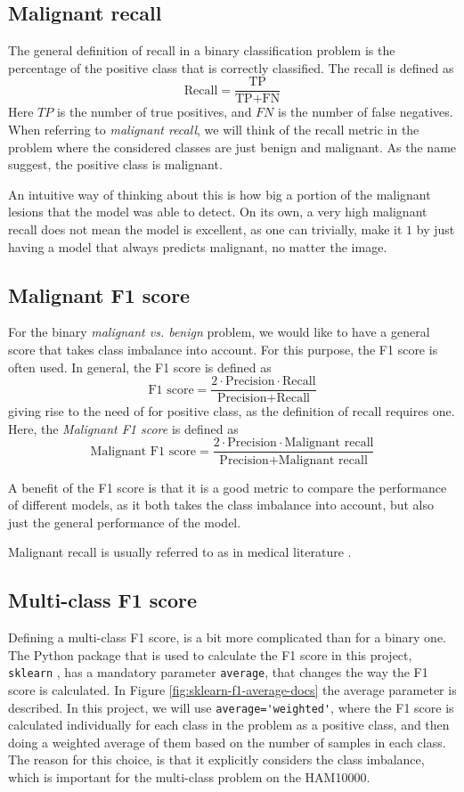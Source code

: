 \subsection{Malignant recall}
The general definition of recall in a binary classification problem is the percentage of the positive class
that is correctly classified.
The recall is defined as
\[
    \text{Recall} = \frac{\text{TP}}{\text{TP} + \text{FN}}
\]
Here $TP$ is the number of true positives, and $FN$ is the number of false negatives.
When referring to \textit{malignant recall}, we will think of the recall metric in the problem
where the considered classes are just benign and malignant.
As the name suggest, the positive class is malignant.

An intuitive way of thinking about this is how big a portion of the malignant lesions
that the model was able to detect.
On its own, a very high malignant recall does not mean the model is excellent,
as one can trivially, make it $1$ by just having a model that always predicts malignant, no matter the image.

\subsection{Malignant F1 score}
For the binary \textit{malignant vs. benign} problem, we would like to have a general score 
that takes class imbalance into account.
For this purpose, the F1 score is often used.
In general, the F1 score is defined as
\[
    \text{F1 score} = \frac{2 \cdot \text{Precision} \cdot \text{Recall}}{\text{Precision} + \text{Recall}}
\]
giving rise to the need of for positive class, as the definition of recall requires one.
Here, the \textit{Malignant F1 score} is defined as
\[
    \text{Malignant F1 score} = \frac{2\cdot \text{Precision} \cdot \text{Malignant recall}}{\text{Precision} + \text{Malignant recall}}
\]

A benefit of the F1 score is that it is a good metric to compare the performance of different models,
as it both takes the class imbalance into account,
but also just the general performance of the model.

Malignant recall is usually referred to as  in medical literature
\cite{sensitivity-and-specificity}.

\subsection{Multi-class F1 score}
Defining a multi-class F1 score, is a bit more complicated than for a binary one.
The Python package that is used to calculate the F1 score in this project, \verb|sklearn|
\cite{sklearn}, has a mandatory parameter \verb|average|, that changes the way the F1 score is calculated.
In Figure \ref{fig:sklearn-f1-average-docs} the average parameter is described.
In this project, we will use \verb|average='weighted'|, where the F1 score is calculated
individually for each class in the problem as a positive class,
and then doing a weighted average of them based
on the number of samples in each class.
The reason for this choice,
is that it explicitly considers the class imbalance,
which is important for the multi-class problem on the HAM10000.


